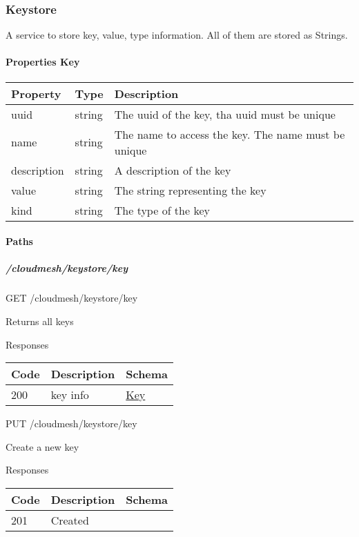 \documentclass[9pt,]{article}
\let\oldparagraph\paragraph
\renewcommand{\paragraph}[1]{\oldparagraph{#1}\mbox{}}
\let\oldsubparagraph\subparagraph
\renewcommand{\subparagraph}[1]{\oldsubparagraph{#1}\mbox{}}
\begin{document}
\hypertarget{keystore}{%
\subsubsection{Keystore}\label{keystore}}

A service to store key, value, type information. All of them are stored
as Strings.

\hypertarget{properties-key}{%
\paragraph{Properties Key}\label{properties-key}}

\begin{longtable}[]{@{}lll@{}}
\toprule
Property & Type & Description\tabularnewline
\midrule
\endhead
uuid & string & The uuid of the key, tha uuid must be
unique\tabularnewline
name & string & The name to access the key. The name must be
unique\tabularnewline
description & string & A description of the key\tabularnewline
value & string & The string representing the key\tabularnewline
kind & string & The type of the key\tabularnewline
\bottomrule
\end{longtable}

\hypertarget{paths-2}{%
\paragraph{Paths}\label{paths-2}}

\hypertarget{cloudmeshkeystorekey}{%
\subparagraph{/cloudmesh/keystore/key}\label{cloudmeshkeystorekey}}

GET /cloudmesh/keystore/key

Returns all keys

Responses

\begin{longtable}[]{@{}lll@{}}
\toprule
Code & Description & Schema\tabularnewline
\midrule
\endhead
200 & key info & \protect\hyperlink{key}{Key}\tabularnewline
\bottomrule
\end{longtable}

PUT /cloudmesh/keystore/key

Create a new key

Responses

\begin{longtable}[]{@{}lll@{}}
\toprule
Code & Description & Schema\tabularnewline
\midrule
\endhead
201 & Created &\tabularnewline
\bottomrule
\end{longtable}
\end{document}
